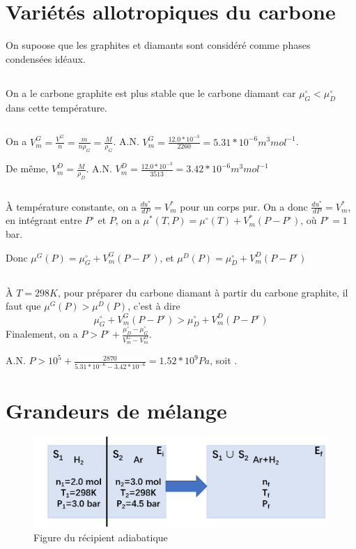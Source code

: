 \documentclass[a4paper,12pt]{book}
\begin{document}
\renewcommand{\labelitemi}{$\blacktriangleright$}
\renewcommand{\labelitemii}{$\bullet$}


\section{Variétés allotropiques du carbone}
On supoose que les graphites et diamants sont considéré comme phases condensées idéaux. 
\subsection{}
On a le carbone graphite est plus stable que le carbone
diamant car $\boxed{\mu^\circ_G<\mu^\circ_D}$ dans cette température.
\subsection{}
On a $\boxed{V^G_m=\frac{V^G}{n}=\frac{m}{n\rho_G}=\frac{M}{\rho_G}}$. 
A.N. $\boxed{V^G_m=\frac{12.0*10^{-3}}{2260}=5.31*10^{-6}m^3mol^{-1}}$.

De même, $\boxed{V^D_m=\frac{M}{\rho_D}}$. 
A.N. $\boxed{V^D_m=\frac{12.0*10^{-3}}{3513}=3.42*10^{-6}m^3mol^{-1}}$
\subsection{}
À température constante, on a $\frac{du^*}{dP}=V_m^*$ pour un corps pur. 
On a donc $\frac{du^*}{dP}=V_m^*$, en intégrant entre $P^\circ$ et $P$, on a 
$\mu^*(T,P)=\mu^\circ(T)+V_m^*(P-P^\circ)$, où $P^\circ=1$ bar.

Donc $\boxed{\mu^G(P)=\mu_G^\circ+V_m^G(P-P^\circ)}$, et 
$\boxed{\mu^D(P)=\mu_D^\circ+V_m^D(P-P^\circ)}$
\subsection{}
À $T=298K$, pour préparer du carbone diamant à partir du carbone graphite, il faut que 
$\mu^G(P)>\mu^D(P)$, c'est à dire $$\mu_G^\circ+V_m^G(P-P^\circ)>\mu_D^\circ+V_m^D(P-P^\circ)$$
Finalement, on a $\boxed{P>P^\circ+\frac{\mu_D^\circ-\mu_G^\circ}{V_m^G-V_m^D}}$. 

A.N. $P>10^5+\frac{2870}{5.31*10^{-6}-3.42*10^{-6}}=1.52*10^9 Pa$, soit .
\section{Grandeurs de mélange}
\begin{figure}[h]
    \begin{center}
    \includegraphics[scale=0.6]{dm2.png}
    \end{center}
    \caption{Figure du récipient adiabatique}
\end{figure}
\end{document}
